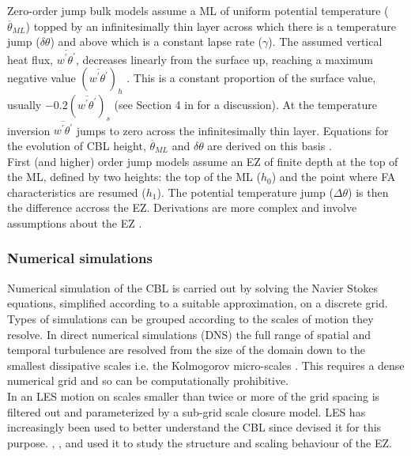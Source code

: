 Zero-order jump bulk models assume a ML of uniform potential temperature ($\overline{\theta}_{ML}$) topped by an infinitesimally thin layer across which there is a temperature jump ($\delta \theta$) and above which is a constant lapse rate ($\gamma$).  The assumed vertical heat flux, $\overline{w^{'}\theta^{'}}$, decreases linearly from the surface up, reaching a maximum negative value $(\overline{w^{'}\theta^{'}})_{h}$ .  This is a constant proportion of the surface value, usually $-0.2(\overline{w^{'}\theta^{'}})_{s}$ (see Section 4 in \cite{Tennekes73} for a discussion). At the temperature inversion $\overline{w^{'}\theta^{'}}$ jumps to zero across the infinitesimally thin layer.  Equations for the evolution of CBL height, $\overline{\theta}_{ML}$ and $\delta \theta$ are derived on this basis \citep{Tennekes73}.\\

First (and higher) order jump models assume an EZ of finite depth at the top of the ML, defined by two heights:  the top of the ML ($h_{0}$) and the point where FA characteristics are resumed ($h_{1}$).  The potential temperature jump ($\Delta \theta$) is then the difference accross the EZ.  Derivations are more complex and involve assumptions about the EZ \citep{Betts74, BatchGryn, Stull73, Deardorff79, FedConzMir04}.\\

\subsubsection{Numerical simulations}
\label{subsec:numsim}

Numerical simulation of the CBL is carried out by solving the Navier Stokes equations, simplified according to a suitable approximation, on a discrete grid.  Types of simulations can be grouped according to the scales of motion they resolve.  In direct numerical simulations (DNS) the full range of spatial and temporal turbulence are resolved from the size of the domain down to the smallest dissipative scales i.e. the Kolmogorov micro-scales \citep{Kolmog}.  This requires a dense numerical grid and so can be computationally prohibitive.\\

In an LES motion on scales smaller than twice or more of the grid spacing is filtered out and parameterized by a sub-grid scale closure model. LES has increasingly been used to better understand the CBL since \cite{Deardorff72} devised it for this purpose.  \cite{SullMoengStev}, \cite{FedConzMir04}, \cite{EbSchu} and \cite{BrooksFowler2} used it to study the structure and scaling behaviour of the EZ.\\

